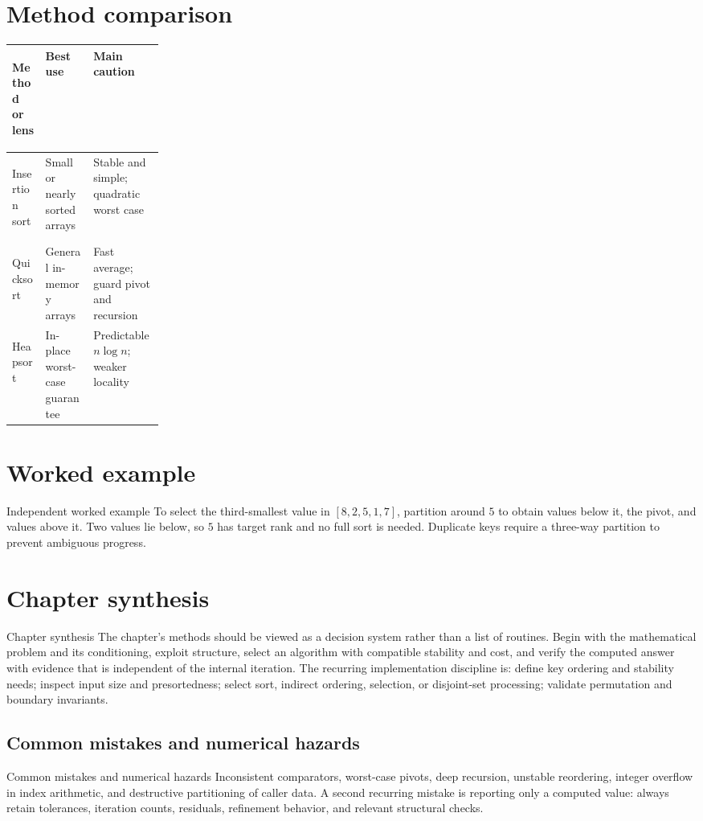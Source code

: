 \documentclass[10pt,letterpaper]{article}
\begin{document}
\section*{Method comparison}
\begin{center}
\small
\begin{tabularx}{\linewidth}{>{\bfseries\raggedright\arraybackslash}p{0.22\linewidth}XX}
\toprule
Method or lens & Best use & Main caution \\
\midrule
Insertion sort & Small or nearly sorted arrays & Stable and simple; quadratic worst case \\
Quicksort & General in-memory arrays & Fast average; guard pivot and recursion \\
Heapsort & In-place worst-case guarantee & Predictable $n\log n$; weaker locality \\
\bottomrule
\end{tabularx}
\end{center}

\section*{Worked example}
\begin{exambox}{Independent worked example}
To select the third-smallest value in $[8,2,5,1,7]$, partition around $5$ to obtain values below it, the pivot, and values above it.  Two values lie below, so $5$ has target rank and no full sort is needed.  Duplicate keys require a three-way partition to prevent ambiguous progress.
\end{exambox}

\section*{Chapter synthesis}
\begin{summarybox}{Chapter synthesis}
The chapter's methods should be viewed as a decision system rather than a list of routines.  Begin with the mathematical problem and its conditioning, exploit structure, select an algorithm with compatible stability and cost, and verify the computed answer with evidence that is independent of the internal iteration.  The recurring implementation discipline is: define key ordering and stability needs; inspect input size and presortedness; select sort, indirect ordering, selection, or disjoint-set processing; validate permutation and boundary invariants.
\end{summarybox}

\subsection*{Common mistakes and numerical hazards}
\begin{warnbox}{Common mistakes and numerical hazards}
Inconsistent comparators, worst-case pivots, deep recursion, unstable reordering, integer overflow in index arithmetic, and destructive partitioning of caller data.  A second recurring mistake is reporting only a computed value: always retain tolerances, iteration counts, residuals, refinement behavior, and relevant structural checks.
\end{warnbox}
\end{document}
